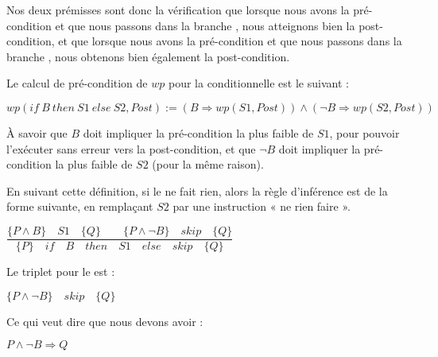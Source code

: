 \documentclass[middle]{zmdocument}
\begin{document}
Nos deux prémisses sont donc la vérification que lorsque nous avons la 
pré-condition et que nous passons dans la branche , nous atteignons bien la
post-condition, et que lorsque nous avons la pré-condition et que nous passons
dans la branche , nous obtenons bien également la post-condition.



Le calcul de pré-condition de $wp$ pour la conditionnelle est le suivant :




\begin{center}
$wp(if\ B\ then\ S1\ else\ S2 , Post) := (B \Rightarrow wp(S1, Post)) \wedge (\neg B \Rightarrow wp(S2, Post))$


\end{center}


À savoir que $B$ doit impliquer la pré-condition la plus faible de $S1$, pour 
pouvoir l'exécuter sans erreur vers la post-condition, et que $\neg B$ doit 
impliquer la pré-condition la plus faible de $S2$ (pour la même raison).





En suivant cette définition, si le  ne fait rien, alors la règle
d'inférence est de la forme suivante, en remplaçant $S2$ par une instruction
« ne rien faire ».




\begin{center}
$\dfrac{\{P \wedge B\}\quad S1\quad \{Q\} \quad \quad \{P \wedge \neg B\}\quad skip\quad \{Q\}}{\{P\}\quad if\quad B\quad then\quad S1\quad else\quad skip \quad \{Q\}}$


\end{center}


Le triplet pour le  est :




\begin{center}
$\{P \wedge \neg B\}\quad skip\quad \{Q\}$


\end{center}


Ce qui veut dire que nous devons avoir :




\begin{center}
$P \wedge \neg B \Rightarrow Q$


\end{center}
\end{document}

